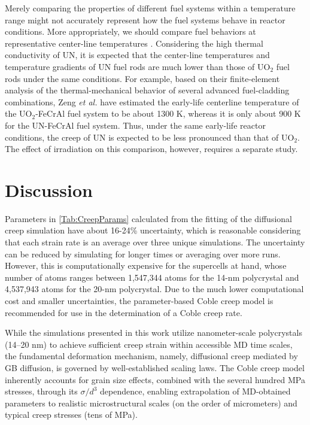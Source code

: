 \documentclass[preprint,12pt,sort&compress]{elsarticle}
\newcommand{\?}{\stackrel{?}{=}}
\begin{document}
Merely comparing the properties of different fuel systems within a temperature range might not accurately represent how the fuel systems behave in reactor conditions. More appropriately, we should compare fuel behaviors at representative center-line temperatures \cite{Cheniour2020}. Considering the high thermal conductivity of UN, it is expected that the center-line temperatures and temperature gradients of UN fuel rods are much lower than those of UO$_2$ fuel rods under the same conditions. For example, based on their finite-element analysis of the thermal-mechanical behavior of several advanced fuel-cladding combinations, Zeng \textit{et al.} \cite{Zeng2021} have estimated the early-life centerline temperature of the UO$_2$-FeCrAl fuel system to be about 1300 K, whereas it is only about 900 K for the UN-FeCrAl fuel system. Thus, under the same early-life reactor conditions, the creep of UN is expected to be less pronounced than that of UO$_2$. The effect of irradiation on this comparison, however, requires a separate study.

\section{Discussion}


Parameters in \cref{Tab:CreepParams} calculated from the fitting of the diffusional creep simulation have about 16-24\% uncertainty, which is reasonable considering that each strain rate is an average over three unique simulations. The uncertainty can be reduced by simulating for longer times or averaging over more runs. However, this is computationally expensive for the supercells at hand, whose number of atoms ranges between 1,547,344 atoms for the 14-nm polycrystal and 4,537,943 atoms for the 20-nm polycrystal. Due to the much lower computational cost and smaller uncertainties, the parameter-based Coble creep model is recommended for use in the determination of a Coble creep rate.

While the simulations presented in this work utilize nanometer-scale polycrystals (14--20 nm) to achieve sufficient creep strain within accessible MD time scales, the fundamental deformation mechanism, namely, diffusional creep mediated by GB diffusion, is governed by well-established scaling laws. The Coble creep model inherently accounts for grain size effects, combined with the several hundred MPa stresses, through its $\sigma/d^{3}$ dependence, enabling extrapolation of MD-obtained parameters to realistic microstructural scales (on the order of micrometers) and typical creep stresses (tens of MPa).
\end{document}
